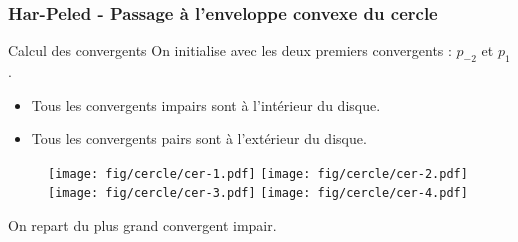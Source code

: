 \begin{frame}
  \frametitle{Har-Peled - Passage à l'enveloppe convexe du cercle}
  		
			\begin{block}{Calcul des convergents}
					On initialise avec les deux premiers convergents : $p_{-2}$ et $p_{1}$.
				\begin{itemize}
	        \item Tous les convergents impairs sont à l'intérieur du disque.
					\item Tous les convergents pairs sont à l'extérieur du disque.
	      \end{itemize}
		
	    \end{block}

				\begin{figure}[h!]
					\centering
				  \texttt{[image: fig/cercle/cer-1.pdf]}
				  \texttt{[image: fig/cercle/cer-2.pdf]}
					\texttt{[image: fig/cercle/cer-3.pdf]}
				  \texttt{[image: fig/cercle/cer-4.pdf]}
			 	\end{figure}    
      {
			\begin{block}{}
					\alert{On repart du plus grand convergent impair.}
	    \end{block}
      }

\end{frame}


